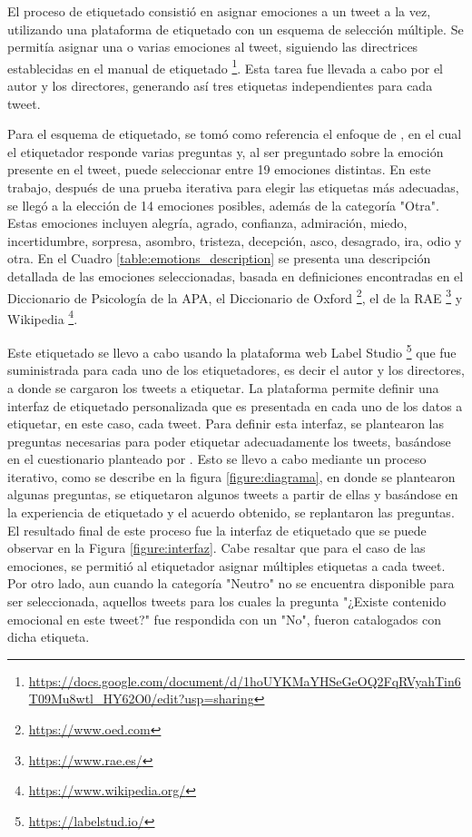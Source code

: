 El proceso de etiquetado consistió en asignar emociones a un tweet a la vez, utilizando una plataforma de etiquetado con un esquema de selección múltiple. Se permitía asignar una o varias emociones al tweet, siguiendo las directrices establecidas en el manual de etiquetado \footnote{\url{https://docs.google.com/document/d/1hoUYKMaYHSeGeOQ2FqRVyahTin6T09Mu8wtl_HY62O0/edit?usp=sharing}}. Esta tarea fue llevada a cabo por el autor y los directores, generando así tres etiquetas independientes para cada tweet.

Para el esquema de etiquetado, se tomó como referencia el enfoque de \cite{mohammad2015sentiment}, en el cual el etiquetador responde varias preguntas y, al ser preguntado sobre la emoción presente en el tweet, puede seleccionar entre 19 emociones distintas. En este trabajo, después de una prueba iterativa para elegir las etiquetas más adecuadas, se llegó a la elección de 14 emociones posibles, además de la categoría "Otra". Estas emociones incluyen alegría, agrado, confianza, admiración, miedo, incertidumbre, sorpresa, asombro, tristeza, decepción, asco, desagrado, ira, odio y otra. En el Cuadro \ref{table:emotions_description} se presenta una descripción detallada de las emociones seleccionadas, basada en definiciones encontradas en el Diccionario de Psicología de la APA, el Diccionario de Oxford \footnote{\url{https://www.oed.com}}, el de la RAE \footnote{\url{https://www.rae.es/}} y Wikipedia \footnote{\url{https://www.wikipedia.org/}}.

\tiny

\normalsize



Este etiquetado se llevo a cabo usando la plataforma web Label Studio \footnote{\url{https://labelstud.io/}} que fue suministrada para cada uno de los etiquetadores, es decir el autor y los directores, a donde se cargaron los tweets a etiquetar. La plataforma permite definir una interfaz de etiquetado personalizada que es presentada en cada uno de los datos a etiquetar, en este caso, cada tweet. Para definir esta interfaz, se plantearon las preguntas necesarias para poder etiquetar adecuadamente los tweets, basándose en el cuestionario planteado por \cite{mohammad2015sentiment}. Esto se llevo a cabo mediante un proceso iterativo, como se describe en la figura \ref{figure:diagrama}, en donde se plantearon algunas preguntas, se etiquetaron algunos tweets a partir de ellas y basándose en la experiencia de etiquetado y el acuerdo obtenido, se replantaron las preguntas. El resultado final de este proceso fue la interfaz de etiquetado que se puede observar en la Figura \ref{figure:interfaz}. Cabe resaltar que para el caso de las emociones, se permitió al etiquetador asignar múltiples etiquetas a cada tweet. Por otro lado, aun cuando la categoría "Neutro" no se encuentra disponible para ser seleccionada, aquellos tweets para los cuales la pregunta "¿Existe contenido emocional en este tweet?" fue respondida con un "No", fueron catalogados con dicha etiqueta. 

